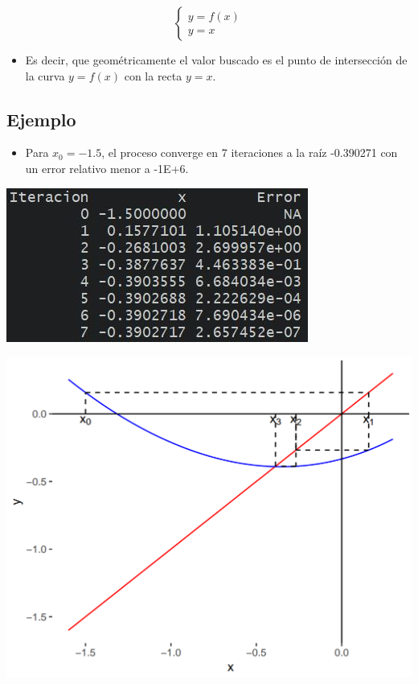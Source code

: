 \documentclass[openany]{book}
\providecommand{\tightlist}{%
  \setlength{\itemsep}{0pt}\setlength{\parskip}{0pt}}
\begin{document}
\begin{equation}
  \begin{cases}
    y = f(x) \\
    y = x
  \end{cases}
\end{equation}

\begin{itemize}
\tightlist
\item
  Es decir, que geométricamente el valor buscado es el punto de intersección de la curva \(y=f(x)\) con la recta \(y=x\).
\end{itemize}

\hypertarget{ejemplo-5}{%
\subsection{Ejemplo}\label{ejemplo-5}}

\begin{itemize}
\tightlist
\item
  Para \(x_0 = -1.5\), el proceso converge en 7 iteraciones a la raíz -0.390271 con un error relativo menor a -1E+6.
\end{itemize}

\begin{center}\includegraphics[width=1\linewidth]{Plots/U2/rtdo} \end{center}

\begin{center}\includegraphics[width=1\linewidth]{Plots/U2/f3} \end{center}
\end{document}
